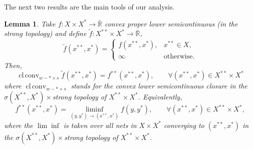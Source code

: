 \documentclass[11pt]{article}
\newcommand{\BR}{\bar{\mathbb{R}}}
\DeclareMathOperator{\clconv}{cl\,conv}
\newtheorem{lemma}[theorem]{Lemma}
\begin{document}
The next two results are the main tools of our analysis.
\begin{lemma}\label{lm:1}
  Take $f:X\times X^{*}\to\BR$ convex proper lower semicontinuous (in
  the strong topology) and define $\tilde f:X^{**}\times X^*\to\BR$,
  \[ 
  \tilde f(x^{**},x^*)=
  \begin{cases}
    f(x^{**},x^*),& x^{**}\in X,\\
    \infty &\mbox{otherwise}.
  \end{cases}
  \]
  Then, 
  \[ \clconv_{w-* \times s} \tilde
  f(x^{**},x^*)=f^{**}(x^{**},x^*),\qquad \forall (x^{**},x^*)\in
  X^{**}\times X^*
  \]
  where $\clconv_{w-*\times s}$ stands for the convex lower
  semicontinuous closure in the $\sigma(X^{**},X^*)\times$strong
  topology of $X^{**}\times X^*$.
  Equivalently,
  \[ f^{**}(x^{**},x^*)=\liminf_{(y,y^*)\to(x^{**},x^*)}f(y,y^*),
    \qquad \forall  (x^{**},x^*)\in
  X^{**}\times X^*,
  \]
  where the $\lim\inf$ is taken over all nets in $X\times X^*$ converging to
  $(x^{**},x^*)$ in the  $\sigma(X^{**},X^*)\times$strong
  topology of $X^{**}\times X^*$. 
\end{lemma}
\end{document}
